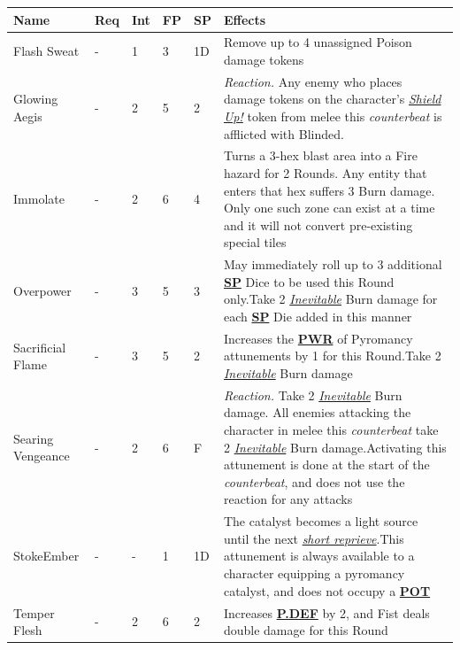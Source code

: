 \documentclass[12pt]{article}
\newcommand{\refto}[1]{\hyperlink{#1}{\textbf{#1}}}
\newcommand{\reftoit}[1]{\hyperlink{#1}{\emph{#1}}}
\begin{document}
\begin{center}
\begin{tabularx}{\textwidth}{p{}p{}p{}p{}p{}p{}}
\hline
\textbf{Name} & \textbf{Req} & \textbf{Int} & \textbf{FP} & \textbf{SP} & \textbf{Effects} \\
\hline
Flash Sweat & - & 1 & 3 & 1D & Remove up to 4 unassigned Poison damage tokens \\
Glowing Aegis & - & 2 & 5 & 2 & \emph{Reaction.} Any enemy who places damage tokens on the character’s \reftoit{Shield Up!} token from melee this \emph{counterbeat} is afflicted with Blinded.\\
Immolate & - & 2 & 6 & 4 & Turns a 3-hex blast area into a Fire hazard for 2 Rounds. Any entity that enters that hex suffers 3 Burn damage. Only one such zone can exist at a time and it will not convert pre-existing special tiles \\
Overpower & - & 3 & 5 & 3 & May immediately roll up to 3 additional \refto{SP} Dice to be used this Round only.\newline Take 2 \reftoit{Inevitable} Burn damage for each \refto{SP} Die added in this manner\\
Sacrificial Flame & - & 3 & 5 & 2 & Increases the \refto{PWR} of Pyromancy attunements by 1 for this Round.\newline Take 2 \reftoit{Inevitable} Burn damage\\
Searing Vengeance & - & 2 & 6 & F & \emph{Reaction.} Take 2 \reftoit{Inevitable} Burn damage. All enemies attacking the character in melee this \emph{counterbeat} take 2 \reftoit{Inevitable} Burn damage.\newline Activating this attunement is done at the start of the \emph{counterbeat}, and does not use the reaction for any attacks\\
Stoke\newline Ember & - & - & 1 & 1D & The catalyst becomes a light source until the next \reftoit{short reprieve}.\newline This attunement is always available to a character equipping a pyromancy catalyst, and does not occupy a \refto{POT} \\
Temper Flesh & - & 2 & 6 & 2 & Increases \refto{P.DEF} by 2, and Fist deals double damage for this Round \\
\hline
\end{tabularx}
\end{center}
\end{document}
